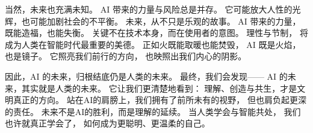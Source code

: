 当然，未来也充满未知。  
AI 带来的力量与风险总是并存。  
它可能放大人性的光辉，也可能加剧社会的不平衡。  
未来，从不只是乐观的故事。  
AI 带来的力量，既能造福，也能失衡。  
关键不在技术本身，而在使用者的意图。  
理性与节制，  
将成为人类在智能时代最重要的美德。  
正如火既能取暖也能焚毁，  
AI 既是火焰，也是镜子。  
它照亮我们前行的方向，  
也映照出我们内心的阴影。

因此，AI 的未来，归根结底仍是人类的未来。  
最终，我们会发现——  
AI 的未来，其实就是人类的未来。  
它让我们更清楚地看到：  
理解、创造与共生，才是文明真正的方向。  
站在AI的肩膀上，我们拥有了前所未有的视野，  
但也肩负起更深的责任。  
未来不是AI的胜利，而是理解的延续。  
当人类学会与智能共处，  
我们也许就真正学会了，  
如何成为更聪明、更温柔的自己。










